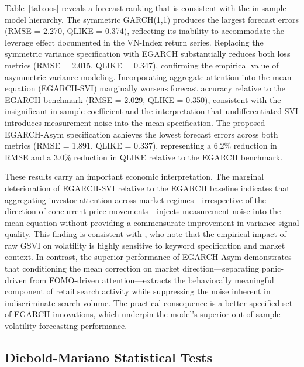 \documentclass[12pt, a4paper]{article}
\begin{document}
Table~\ref{tab:oos} reveals a forecast ranking that is consistent with the in-sample model hierarchy. The symmetric GARCH(1,1) produces the largest forecast errors (RMSE = 2.270, QLIKE = 0.374), reflecting its inability to accommodate the leverage effect documented in the VN-Index return series. Replacing the symmetric variance specification with EGARCH substantially reduces both loss metrics (RMSE = 2.015, QLIKE = 0.347), confirming the empirical value of asymmetric variance modeling. Incorporating aggregate attention into the mean equation (EGARCH-SVI) marginally worsens forecast accuracy relative to the EGARCH benchmark (RMSE = 2.029, QLIKE = 0.350), consistent with the insignificant in-sample coefficient and the interpretation that undifferentiated SVI introduces measurement noise into the mean specification. The proposed EGARCH-Asym specification achieves the lowest forecast errors across both metrics (RMSE = 1.891, QLIKE = 0.337), representing a 6.2\% reduction in RMSE and a 3.0\% reduction in QLIKE relative to the EGARCH benchmark.

These results carry an important economic interpretation. The marginal deterioration of EGARCH-SVI relative to the EGARCH baseline indicates that aggregating investor attention across market regimes—irrespective of the direction of concurrent price movements—injects measurement noise into the mean equation without providing a commensurate improvement in variance signal quality. This finding is consistent with \citet{ayala2024}, who note that the empirical impact of raw GSVI on volatility is highly sensitive to keyword specification and market context. In contrast, the superior performance of EGARCH-Asym demonstrates that conditioning the mean correction on market direction—separating panic-driven from FOMO-driven attention—extracts the behaviorally meaningful component of retail search activity while suppressing the noise inherent in indiscriminate search volume. The practical consequence is a better-specified set of EGARCH innovations, which underpin the model's superior out-of-sample volatility forecasting performance.

\subsection{Diebold-Mariano Statistical Tests}
\end{document}
